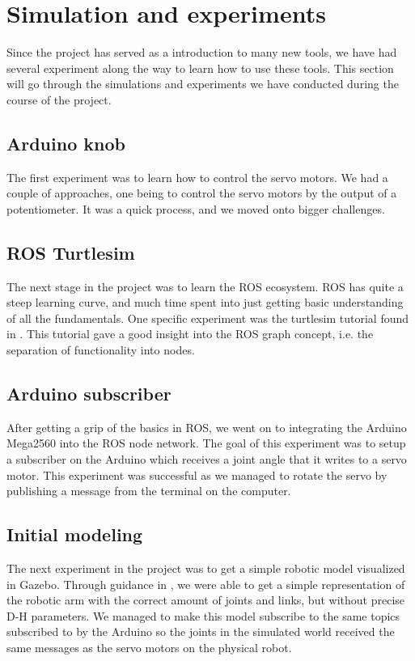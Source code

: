 \documentclass[11pt,a4paper, titlepage]{article}
\begin{document}
		
	\section{Simulation and experiments}
	\label{simex}
	Since the project has served as a introduction to many new tools, we have had several experiment along the way to learn how to use these tools. This section will go through the simulations and experiments we have conducted during the course of the project.
	
	\subsection{Arduino knob}
	The first experiment was to learn how to control the servo motors. We had a couple of approaches, one being to control the servo motors by the output of a potentiometer. It was a quick process, and we moved onto bigger challenges.
	
	\subsection{ROS Turtlesim}
	The next stage in the project was to learn the ROS ecosystem. ROS has quite a steep learning curve, and much time spent into just getting basic understanding of all the fundamentals. One specific experiment was the turtlesim tutorial found in \cite{turtle2017}. This tutorial gave a good insight into the ROS graph concept, i.e. the separation of functionality into nodes.
	
	\subsection{Arduino subscriber}
	After getting a grip of the basics in ROS, we went on to integrating the Arduino Mega2560 into the ROS node network. The goal of this experiment was to setup a subscriber on the Arduino which receives a joint angle that it writes to a servo motor. This experiment was successful as we managed to rotate the servo by publishing a message from the terminal on the computer.
	
	\subsection{Initial modeling}
	The next experiment in the project was to get a simple robotic model visualized in Gazebo. Through guidance in \cite{joseph2015}, we were able to get a simple representation of the robotic arm with the correct amount of joints and links, but without precise D-H parameters. We managed to make this model subscribe to the same topics subscribed to by the Arduino so the joints in the simulated world received the same messages as the servo motors on the physical robot.
	
\end{document}
